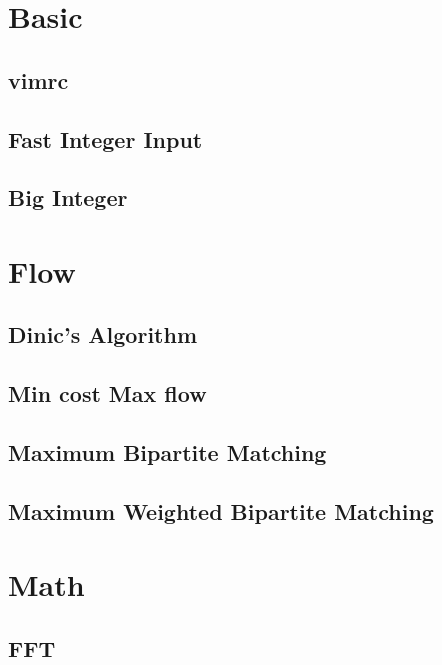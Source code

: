 \documentclass[a4paper,10pt,twocolumn,oneside]{article}
\begin{document}
\pagestyle{fancy}
\fancyfoot{}
\fancyhead[R]{\thepage}
\renewcommand{\headrulewidth}{0.4pt}
\renewcommand{\contentsname}{Contents} 

\scriptsize
\tableofcontents
\newpage
\section{Basic}
\subsection{vimrc}

\subsection{Fast Integer Input}

\subsection{Big Integer}

\section{Flow}
\subsection{Dinic's Algorithm}

\subsection{Min cost Max flow}

\subsection{Maximum Bipartite Matching}

\subsection{Maximum Weighted Bipartite Matching}

\section{Math}
\subsection{FFT}

\end{document}
